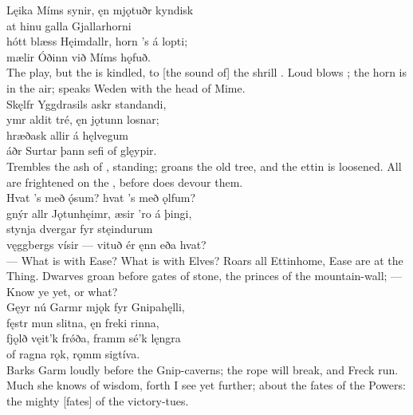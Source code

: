 \bva Lęika Míms synir, \hld ęn mjǫtuðr kyndisk \\%
at hinu galla \hld Gjallarhorni \\%
hótt blæss Hęimdallr, \hld horn ’s á lopti; \\%
mælir Óðinn \hld við Míms hǫfuð.\\%

\bvb The  play, but the  is kindled, to [the sound of] the shrill . Loud blows ; the horn is in the air; speaks Weden with the head of Mime.\\%

\bva Skęlfr Yggdrasils \hld askr standandi, \\%
ymr aldit tré, \hld ęn jǫtunn losnar; \\%
hræðask allir \hld á hęlvegum \\%
áðr Surtar þann \hld sefi of glęypir.\\%

\bvb Trembles the ash of , standing; groans the old tree, and the ettin is loosened. All are frightened on the , before  does devour them.\\%

\bva Hvat ’s með ǫ́sum? \hld hvat ’s með ǫlfum? \\%
gnýr allr Jǫtunhęimr, \hld æsir ’ro á þingi, \\%
stynja dvergar \hld fyr stęindurum \\%
vęggbergs vísir — \hld vituð ér ęnn eða hvat?\\%

\bvb — What is with Ease? What is with Elves? Roars all Ettinhome, Ease are at the Thing. Dwarves groan before gates of stone, the princes of the mountain-wall; — Know ye yet, or what?\\%

\bva Gęyr nú Garmr mjǫk \hld fyr Gnipahęlli, \\%
fęstr mun slitna, \hld ęn freki rinna, \\%
fjǫlð vęit’k frǿða, \hld framm sé’k lęngra \\%
of ragna rǫk, \hld rǫmm sigtíva.\\%

\bvb Barks Garm loudly before the Gnip-caverns; the rope will break, and Freck run. Much she knows of wisdom, forth I see yet further; about the fates of the Powers: the mighty [fates] of the victory-tues.\\%

